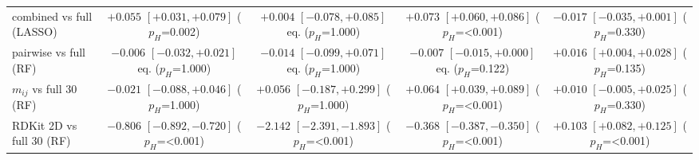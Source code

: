 \begin{table}[h]
{\begin{tabular}{lcccc}
combined vs full (LASSO) & $+0.055$ $[+0.031,+0.079]$  ($p_H$=0.002) & $+0.004$ $[-0.078,+0.085]$ eq. ($p_H$=1.000) & $+0.073$ $[+0.060,+0.086]$  ($p_H$=<0.001) & $-0.017$ $[-0.035,+0.001]$  ($p_H$=0.330)\\
pairwise vs full (RF) & $-0.006$ $[-0.032,+0.021]$ eq. ($p_H$=1.000) & $-0.014$ $[-0.099,+0.071]$ eq. ($p_H$=1.000) & $-0.007$ $[-0.015,+0.000]$ eq. ($p_H$=0.122) & $+0.016$ $[+0.004,+0.028]$  ($p_H$=0.135)\\
$m_{ij}$ vs full 30 (RF) & $-0.021$ $[-0.088,+0.046]$  ($p_H$=1.000) & $+0.056$ $[-0.187,+0.299]$  ($p_H$=1.000) & $+0.064$ $[+0.039,+0.089]$  ($p_H$=<0.001) & $+0.010$ $[-0.005,+0.025]$  ($p_H$=0.330)\\
RDKit 2D vs full 30 (RF) & $-0.806$ $[-0.892,-0.720]$  ($p_H$=<0.001) & $-2.142$ $[-2.391,-1.893]$  ($p_H$=<0.001) & $-0.368$ $[-0.387,-0.350]$  ($p_H$=<0.001) & $+0.103$ $[+0.082,+0.125]$  ($p_H$=<0.001)\\
\bottomrule
\end{tabular}}
\end{table}
